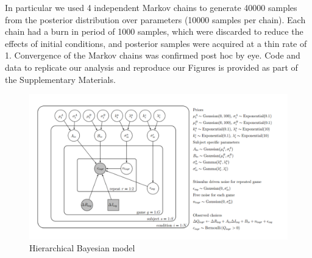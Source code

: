 \documentclass[12pt]{article}
\begin{document}
	In particular we used 4 independent Markov chains to generate 40000 samples from the posterior distribution over parameters (10000 samples per chain).  Each chain had a burn in period of 1000 samples, which were discarded to reduce the effects of initial conditions, and posterior samples were acquired at a thin rate of 1.  Convergence of the Markov chains was confirmed post hoc by eye. Code and data to replicate our analysis and reproduce our Figures is provided as part of the Supplementary Materials.
	
	\begin{figure}[H]
		\begin{center}
			\includegraphics[width=\textwidth]{figures/Figure3.pdf}
			\caption{Hierarchical Bayesian model}
			\label{fig:model}
		\end{center}
	\end{figure}
	
	
	
	
	
	
	
\end{document}
